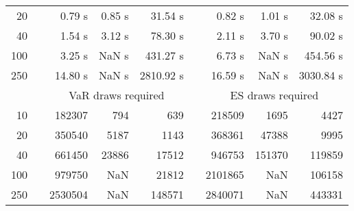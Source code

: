 {{\begin{longtable}{rr rrr r rrr}
20 & & 0.79 s & 0.85 s & 31.54 s && 0.82 s & 1.01 s & 32.08 s \\ 
40 & & 1.54 s & 3.12 s & 78.30 s && 2.11 s & 3.70 s & 90.02 s \\ 
100 & & 3.25 s &  NaN s & 431.27 s && 6.73 s &  NaN s & 454.56 s \\ 
250 & & 14.80 s &  NaN s & 2810.92 s && 16.59 s &  NaN s & 3030.84 s \\ 
\hline 
 && \multicolumn{3}{c}{VaR draws required} &&   \multicolumn{3}{c}{ES draws required} \\  \cline{3-5}  \cline{7-9} 
10 & & 182307 & 794 & 639 && 218509 & 1695 & 4427 \\ 
20 & & 350540 & 5187 & 1143 && 368361 & 47388 & 9995 \\ 
40 & & 661450 & 23886 & 17512 && 946753 & 151370 & 119859 \\ 
100 & & 979750 & NaN & 21812 && 2101865 & NaN & 106158 \\ 
250 & & 2530504 & NaN & 148571 && 2840071 & NaN & 443331 \\ 
\hline 
\end{longtable} 
} 
} 
